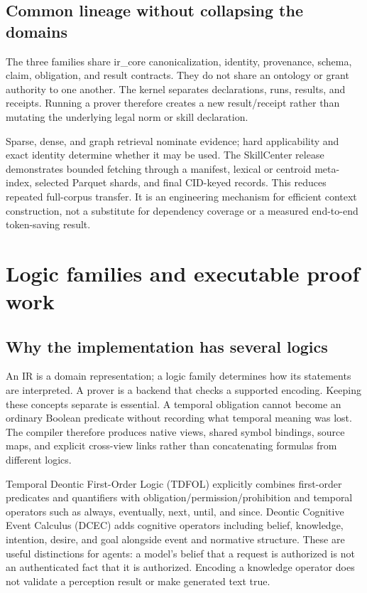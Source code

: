 \documentclass{article}
\begin{document}
\subsection{Common lineage without collapsing the domains}

The three families share ir\_\allowbreak{}core canonicalization, identity, provenance, schema, claim, obligation, and result contracts. They do not share an ontology or grant authority to one another. The kernel separates declarations, runs, results, and receipts. Running a prover therefore creates a new result/receipt rather than mutating the underlying legal norm or skill declaration.


Sparse, dense, and graph retrieval nominate evidence; hard applicability and exact identity determine whether it may be used. The SkillCenter release demonstrates bounded fetching through a manifest, lexical or centroid meta-index, selected Parquet shards, and final CID-keyed records. This reduces repeated full-corpus transfer. It is an engineering mechanism for efficient context construction, not a substitute for dependency coverage or a measured end-to-end token-saving result.

\section{Logic families and executable proof work}

\subsection{Why the implementation has several logics}

An IR is a domain representation; a logic family determines how its statements are interpreted. A prover is a backend that checks a supported encoding. Keeping these concepts separate is essential. A temporal obligation cannot become an ordinary Boolean predicate without recording what temporal meaning was lost. The compiler therefore produces native views, shared symbol bindings, source maps, and explicit cross-view links rather than concatenating formulas from different logics.


Temporal Deontic First-Order Logic (TDFOL) explicitly combines first-order predicates and quantifiers with obligation/permission/prohibition and temporal operators such as always, eventually, next, until, and since. Deontic Cognitive Event Calculus (DCEC) adds cognitive operators including belief, knowledge, intention, desire, and goal alongside event and normative structure. These are useful distinctions for agents: a model's belief that a request is authorized is not an authenticated fact that it is authorized. Encoding a knowledge operator does not validate a perception result or make generated text true.
\end{document}
